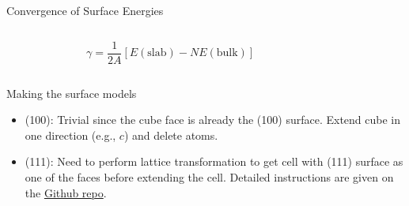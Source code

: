 \documentclass[aspectratio=169]{beamer}
\begin{document}
    \begin{frame}{Convergence of Surface Energies}
        \begin{columns}
            \begin{figure}
                \centering
            \end{figure}
            \begin{equation*}
                \gamma = \frac{1}{2A} [ E(\mathrm{slab})-NE(\mathrm{bulk})]
            \end{equation*}

        \end{columns}
    \end{frame}
    \begin{frame}{Making the surface models}
    \begin{itemize}
        \item (100): Trivial since the cube face is already the (100) surface. Extend cube in one direction (e.g., $c$) and delete atoms.
        \item (111): Need to perform lattice transformation to get cell with (111) surface as one of the faces before extending the cell. Detailed instructions are given on the \href{https://github.com/materialsvirtuallab/nano266/tree/master/labs/lab4}{Github repo}.
    \end{itemize}
    \end{frame}
\end{document}

